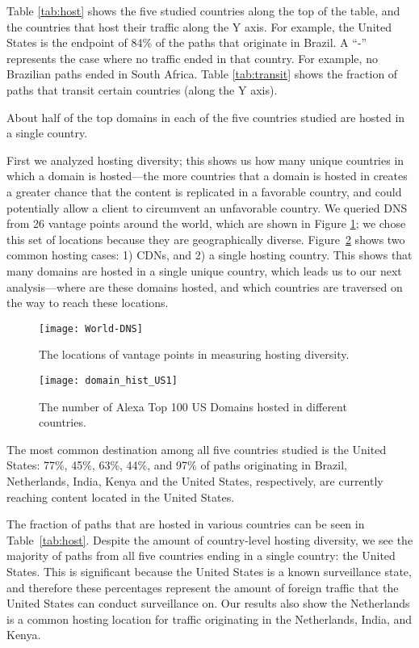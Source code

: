 Table \ref{tab:host} shows the five studied countries along the top of the table, and the countries that host their traffic along the Y axis.  For example, the United States is the endpoint of 84\% of the paths that originate in Brazil.  A ``-'' represents the case where no traffic ended in that country.  For example, no Brazilian paths ended in South Africa. Table \ref{tab:transit} shows the fraction of paths that transit certain countries (along the Y axis).

\begin{finding}
About half of the top domains in each of the five countries studied are hosted in a single country.
\end{finding}
First we analyzed hosting diversity; this shows us how many unique countries in which a domain is hosted---the more countries that a domain is hosted in creates a greater chance that the content is replicated in a favorable country, and could potentially allow a client to circumvent an unfavorable country.  We queried DNS from 26 vantage points around the world, which are shown in Figure \ref{fig:world}; we chose this set of locations because they are geographically diverse.  Figure~\ref{fig:host_diversity} shows two common hosting cases: 1) CDNs, and 2) a single hosting country.  This shows that many domains are hosted in a single unique country, which leads us to our next analysis---where are these domains hosted, and which countries are traversed on the way to reach these locations.

\begin{figure}[t]
\centering
\texttt{[image: World-DNS]}
\caption{The locations of vantage points in measuring hosting diversity.}
\label{fig:world}
\end{figure}

\begin{figure}[t]
\centering
\texttt{[image: domain\_hist\_US1]}
\caption{The number of Alexa Top 100 US Domains hosted in different countries.}
\label{fig:host_diversity}
\end{figure}

\begin{finding}
The most common destination among all five countries studied is the United States: 77\%, 45\%, 63\%, 44\%, and 97\% of paths originating in Brazil, Netherlands, India, Kenya and the United States, respectively, are currently reaching content located in the United States.
\end{finding}
The fraction of paths that are hosted in various countries can be seen in Table~\ref{tab:host}.  Despite the amount of country-level hosting diversity, we see the majority of paths from all five countries ending in a single country: the United States.  This is significant because the United States is a known surveillance state, and therefore these percentages represent the amount of foreign traffic that the United States can conduct surveillance on.  Our results also show the Netherlands is a common hosting location for traffic originating in the Netherlands, India, and Kenya.

